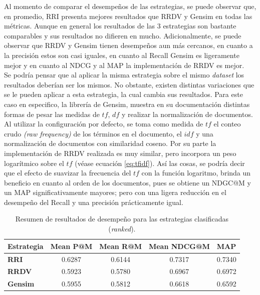 Al momento de comparar el desempeños de las estrategias, se puede observar que, en promedio, RRI presenta mejores resultados que RRDV y Gensim en todas las métricas. Aunque en general los resultados de las 3 estrategias son bastante comparables y sus resultados no difieren en mucho. Adicionalmente, se puede observar que RRDV y Gensim tienen desempeños aun más cercanos, en cuanto a la precisión estos son casi iguales, en cuanto al Recall Gensim es ligeramente mejor y en cuanto al NDCG y al MAP la implementación de RRDV es mejor. \\

Se podría pensar que al aplicar la misma estrategia sobre el mismo \textit{dataset} los resultados deberían ser los mismos. No obstante, existen distintas variaciones que se le pueden aplicar a esta estrategia, la cual cambia sus resultados. Para este caso en especifico, la librería de Gensim, muestra en su documentación distintas formas de pesar las medidas de $tf$, $df$ y realizar la normalización de documentos. Al utilizar la configuración por defecto, se toma como medida de $tf$ el conteo crudo \textit{(raw frequency)} de los términos en el documento, el $idf$ y una normalización de documentos con similaridad coseno. Por su parte la implementación de RRDV realizada es muy similar, pero incorpora un peso logarítmico sobre el $tf$ (véase ecuación \ref{eq:tfidf}). Así las cosas, se podría decir que el efecto de suavizar la frecuencia del $tf$ con la función logaritmo, brinda un beneficio en cuanto al orden de los documentos, pues se obtiene un NDGC@M y un MAP significativamente mayores; pero con una ligera reducción en el desempeño del Recall y una precisión prácticamente igual.

\begin{table}[H]
\centering
\begin{tabular}{|l|c|c|c|c|}
\hline
\textbf{Estrategia} & \multicolumn{1}{l|}{\textbf{Mean P@M}} & \multicolumn{1}{l|}{\textbf{Mean R@M}} & \multicolumn{1}{l|}{\textbf{Mean NDCG@M}} & \multicolumn{1}{l|}{\textbf{MAP}} \\ \hline
\textbf{RRI} & 0.6287 & 0.6144 & 0.7317 & 0.7340 \\ \hline
\textbf{RRDV} & 0.5923 & 0.5780 & 0.6967 & 0.6972 \\ \hline
\textbf{Gensim} & 0.5955 & 0.5812 & 0.6618 & 0.6592 \\ \hline
\end{tabular}
\caption{Resumen de resultados de desempeño para las estrategias clasificadas (\textit{ranked}).}
\label{tab:rankedResults}
\end{table}

